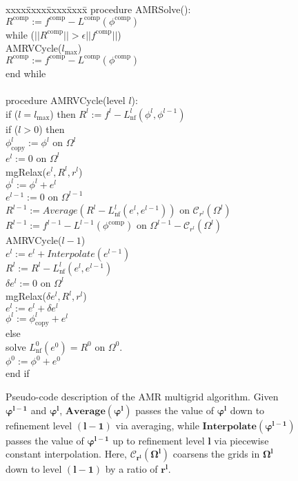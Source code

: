 \documentclass{ieee}
\numberwithin{equation}{section}
\begin{document}
\begin{figure}[thp]
{\small
\begin{tabbing} 
xxxx\=xxxx\=xxxx\=xxxx\=\kill
\> procedure AMRSolve(): \\
\>$R^{\text{comp}}:= f^{\text{comp}} - L^{\text{comp}}(\phi^{\text{comp}})$ \\
\>while ($||R^{\text{comp}}|| > \epsilon ||f^{\text{comp}}||$)\\
\>\>AMRVCycle($l_{\text{max}}$) \\
\>\>$R^{\text{comp}}:= f^{\text{comp}} - L^{\text{comp}}(\phi^{\text{comp}})$\\
\>end while\\
\\
\> procedure AMRVCycle(level $l$):
\\
\>if ($l = l_{\text{max}}$) then $R^l:= f^l - L^{l}_{\text{nf}}(\phi^l,\phi^{l-1})$ \\
\>if ($l > 0 $) then \\
\>\>$\phi^{l}_{\text{copy}} := \phi^l$ on $\Omega^l$ \\
\>\>$e^{l} :=0$ on $\Omega^l$ \\
\>\>mgRelax($e^l, R^l, r^{l}$) \\
\>\>$\phi^l := \phi^l + e^l$ \\
\>\>$e^{l-1} :=0$ on $\Omega^{l-1}$ \\
\>\>$R^{l-1}:= Average(R^{l} - L^{l}_{\text{nf}}(e^l,e^{l-1}))$  on
$\mathcal{C}_{r^{l}}(\Omega^l)$ \\
\>\>$R^{l-1}:= f^{l-1} - L^{l-1}(\phi^{\text{comp}})$  on
$\Omega^{l-1}-\mathcal{C}_{r^{l}}(\Omega^l)$ \\
\>\>AMRVCycle($l-1$) \\
\>\>$e^l := e^l + Interpolate(e^{l-1})$ \\
\>\>$R^l := R^l - L^{l}_{\text{nf}}(e^l, e^{l-1})$ \\
\>\> $\delta e^l := 0$ on $\Omega^l$ \\
\>\>mgRelax($\delta e^l, R^l, r^{l}$) \\
\>\>$e^l := e^l + \delta e^l$ \\
\>\>$\phi^l := \phi^{l}_{\text{copy}} + e^l$ \\
\>else \\        
\>\> solve $L^{0}_{\text{nf}} (e^0) = R^0$ on $\Omega^0$. \\
\>\>$\phi^0 := \phi^0 + e^0$ \\
\>end if
\end{tabbing}
\caption{Pseudo-code description of the AMR multigrid algorithm. Given $\boldsymbol{\varphi^{l-1}}$ and $\boldsymbol{\varphi^l}$, $\boldsymbol{Average(\varphi^l)}$ passes the value of $\boldsymbol{\varphi^l}$ down to refinement level $\boldsymbol{(l-1)}$ via averaging, while $\boldsymbol{Interpolate(\varphi^{l-1})}$ passes the value of  $\boldsymbol{\varphi^{l-1}}$ up to refinement level $\boldsymbol{l}$ via piecewise constant interpolation. Here, $\boldsymbol{\mathcal{C}_{r^{l}}(\Omega^l)}$ coarsens the grids in $\boldsymbol{\Omega^l}$ down to level $\boldsymbol{(l-1)}$ by a ratio of $\boldsymbol{r^l}$. }
\label{MGSUMMARY}
}
\end{figure}
\end{document}
